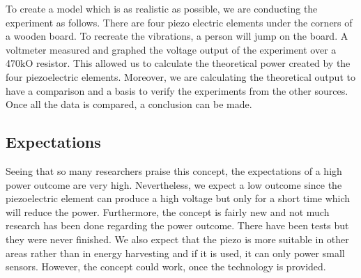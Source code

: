 To create a model which is as realistic as possible, we are conducting the experiment as follows. There are four piezo electric elements under the corners of a wooden board. To recreate the vibrations, a person will jump on the board. A voltmeter measured and graphed the voltage output of the experiment over a 470kO resistor. This allowed us to calculate the theoretical power created by the four piezoelectric elements. Moreover, we are calculating the theoretical output to have a comparison and a basis to verify the experiments from the other sources. Once all the data is compared, a conclusion can be made.

\subsection{Expectations}

Seeing that so many researchers praise this concept, the expectations of a high power outcome are very high. Nevertheless, we expect a low outcome since the piezoelectric element can produce a high voltage but only for a short time which will reduce the power. Furthermore, the concept is fairly new and not much research has been done regarding the power outcome. There have been tests but they were never finished. We also expect that the piezo is more suitable in other areas rather than in energy harvesting and if it is used, it can only power small sensors. However, the concept could work, once the technology is provided.